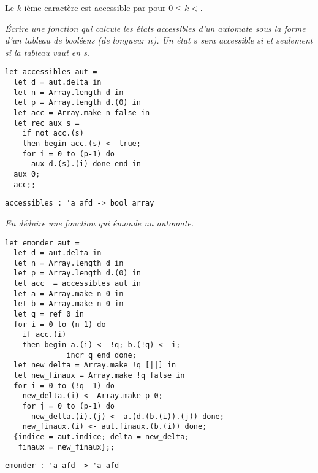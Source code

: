 Le $k$-ième caractère est accessible par  pour $0\le k < $.
\begin{Exercise}\it 
Écrire une fonction qui calcule les états accessibles d'un automate sous la forme d'un tableau de booléens (de longueur $n$). Un état $s$ sera accessible si et seulement si la tableau vaut  en $s$.
\end{Exercise} 
\begin{Answer}
\begin{lstlisting}
let accessibles aut =
  let d = aut.delta in
  let n = Array.length d in
  let p = Array.length d.(0) in
  let acc = Array.make n false in
  let rec aux s =
    if not acc.(s)
    then begin acc.(s) <- true;
    for i = 0 to (p-1) do 
      aux d.(s).(i) done end in
  aux 0;
  acc;;
\end{lstlisting}
\end{Answer} 
\begin{lstlisting}
accessibles : 'a afd -> bool array
\end{lstlisting}
\begin{Exercise}\it 
En déduire une fonction qui émonde un automate.
\end{Exercise} 
\begin{Answer}
\begin{lstlisting}
let emonder aut =
  let d = aut.delta in
  let n = Array.length d in
  let p = Array.length d.(0) in
  let acc  = accessibles aut in
  let a = Array.make n 0 in 
  let b = Array.make n 0 in 
  let q = ref 0 in
  for i = 0 to (n-1) do
    if acc.(i) 
    then begin a.(i) <- !q; b.(!q) <- i; 
              incr q end done;
  let new_delta = Array.make !q [||] in
  let new_finaux = Array.make !q false in
  for i = 0 to (!q -1) do
    new_delta.(i) <- Array.make p 0;
    for j = 0 to (p-1) do 
      new_delta.(i).(j) <- a.(d.(b.(i)).(j)) done;
    new_finaux.(i) <- aut.finaux.(b.(i)) done;
  {indice = aut.indice; delta = new_delta; 
   finaux = new_finaux};;
\end{lstlisting}
\newpage
\end{Answer} 
\begin{lstlisting}
emonder : 'a afd -> 'a afd
\end{lstlisting}






